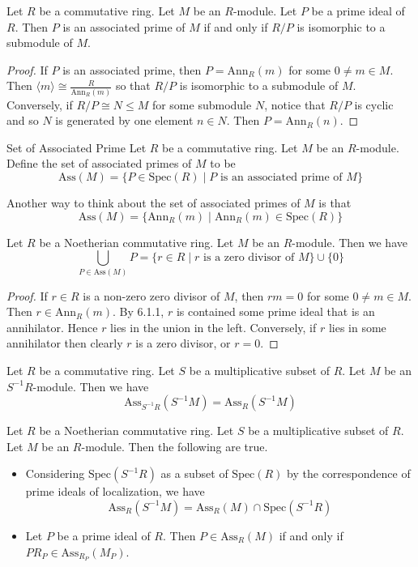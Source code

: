 \documentclass[a4paper]{article}
\begin{document}
\begin{lmm}{}{} Let $R$ be a commutative ring. Let $M$ be an $R$-module. Let $P$ be a prime ideal of $R$. Then $P$ is an associated prime of $M$ if and only if $R/P$ is isomorphic to a submodule of $M$. \tcbline
\begin{proof}
If $P$ is an associated prime, then $P=\text{Ann}_R(m)$ for some $0\neq m\in M$. Then $\langle m\rangle\cong\frac{R}{\text{Ann}_R(m)}$ so that $R/P$ is isomorphic to a submodule of $M$. Conversely, if $R/P\cong N\leq M$ for some submodule $N$, notice that $R/P$ is cyclic and so $N$ is generated by one element $n\in N$. Then $P=\text{Ann}_R(n)$. 
\end{proof}
\end{lmm}

\begin{defn}{Set of Associated Prime}{} Let $R$ be a commutative ring. Let $M$ be an $R$-module. Define the set of associated primes of $M$ to be $$\text{Ass}(M)=\{P\in\text{Spec}(R)\;|\;P\text{ is an associated prime of }M\}$$
\end{defn}

Another way to think about the set of associated primes of $M$ is that $$\text{Ass}(M)=\{\text{Ann}_R(m)\;|\;\text{Ann}_R(m)\in\text{Spec}(R)\}$$

\begin{lmm}{}{} Let $R$ be a Noetherian commutative ring. Let $M$ be an $R$-module. Then we have $$\bigcup_{P\in\text{Ass}(M)}P=\{r\in R\;|\;r\text{ is a zero divisor of }M\}\cup\{0\}$$ \tcbline
\begin{proof}
If $r\in R$ is a non-zero zero divisor of $M$, then $rm=0$ for some $0\neq m\in M$. Then $r\in\text{Ann}_R(m)$. By 6.1.1, $r$ is contained some prime ideal that is an annihilator. Hence $r$ lies in the union in the left. Conversely, if $r$ lies in some annihilator then clearly $r$ is a zero divisor, or $r=0$. 
\end{proof}
\end{lmm}

\begin{prp}{}{} Let $R$ be a commutative ring. Let $S$ be a multiplicative subset of $R$. Let $M$ be an $S^{-1}R$-module. Then we have $$\text{Ass}_{S^{-1}R}(S^{-1}M)=\text{Ass}_R(S^{-1}M)$$
\end{prp}

\begin{prp}{}{} Let $R$ be a Noetherian commutative ring. Let $S$ be a multiplicative subset of $R$. Let $M$ be an $R$-module. Then the following are true. 
\begin{itemize}
\item Considering $\text{Spec}(S^{-1}R)$ as a subset of $\text{Spec}(R)$ by the correspondence of prime ideals of localization, we have $$\text{Ass}_R(S^{-1}M)=\text{Ass}_R(M)\cap\text{Spec}(S^{-1}R)$$
\item Let $P$ be a prime ideal of $R$. Then $P\in\text{Ass}_R(M)$ if and only if $PR_P\in\text{Ass}_{R_P}(M_P)$. 
\end{itemize}
\end{prp}
\end{document}
